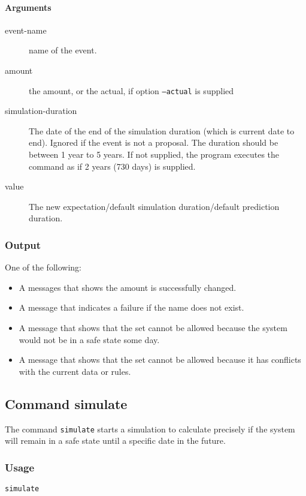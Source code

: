 \paragraph{Arguments}
\begin{description}
	\item[event-name] name of the event.
	\item[amount] the amount, or the actual, if option \texttt{--actual} is supplied
	\item[simulation-duration] The date of the end of the simulation duration (which is current date to end). Ignored if the event is not a proposal. The duration should be between 1 year to 5 years. If not supplied, the program executes the command as if 2 years (730 days) is supplied.
	\item[value] The new expectation/default simulation duration/default prediction duration.
\end{description}

\subsubsection{Output}
One of the following:
\begin{itemize}
	\item A messages that shows the amount is successfully changed.
	\item A message that indicates a failure if the name does not exist.
	\item A message that shows that the set cannot be allowed because the system would not be in a safe state some day.
	\item A message that shows that the set cannot be allowed because it has conflicts with the current data or rules.
\end{itemize}

\subsection{Command simulate}
The command \texttt{simulate} starts a simulation to calculate precisely if the system will remain in a safe state until a specific date in the future.
\subsubsection{Usage}
\begin{center}
	\texttt{simulate} 
\end{center}

